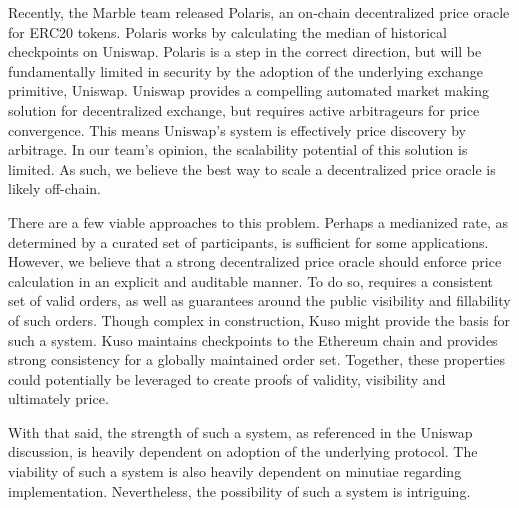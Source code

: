 \documentclass[10pt]{article}
\begin{document}
Recently, the Marble team released Polaris, an on-chain decentralized price oracle for ERC20 tokens. Polaris works by calculating the median of historical checkpoints on Uniswap\cite{polaris-intro-article}. Polaris is a step in the correct direction, but will be fundamentally limited in security by the adoption of the underlying exchange primitive, Uniswap. Uniswap provides a compelling automated market making solution for decentralized exchange, but requires active arbitrageurs for price convergence. This means Uniswap’s system is effectively price discovery by arbitrage. In our team’s opinion, the scalability potential of this solution is limited\cite{uniswap-docs}. As such, we believe the best way to scale a decentralized price oracle is likely off-chain. 
\medskip

There are a few viable approaches to this problem. Perhaps a medianized rate, as determined by a curated set of participants, is sufficient for some applications. However, we believe that a strong decentralized price oracle should enforce price calculation in an explicit and auditable manner. To do so, requires a consistent set of valid orders, as well as guarantees around the public visibility and fillability of such orders. Though complex in construction, Kuso might provide the basis for such a system. Kuso maintains checkpoints to the Ethereum chain and provides strong consistency for a globally maintained order set. Together, these properties could potentially be leveraged to create proofs of validity, visibility and ultimately price. 
\medskip

With that said, the strength of such a system, as referenced in the Uniswap discussion, is heavily dependent on adoption of the underlying protocol. The viability of such a system is also heavily dependent on minutiae regarding implementation. Nevertheless, the possibility of such a system is intriguing.
\clearpage
\pagebreak

\end{document}
